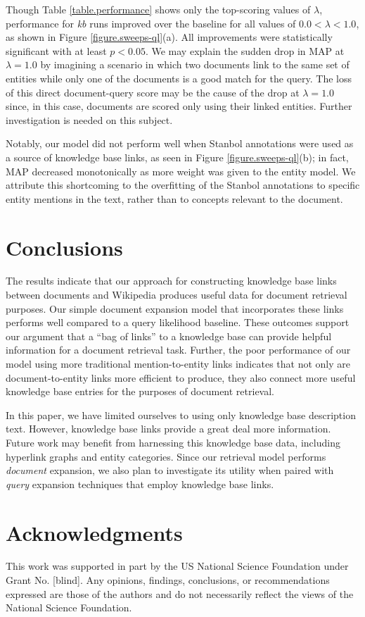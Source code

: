 \documentclass{sig-alternate}
\begin{document}
Though Table \ref{table.performance} shows only the top-scoring values of $\lambda$, performance for \textit{kb} runs improved over the baseline for all values of $0.0 < \lambda < 1.0$, as shown in Figure \ref{figure.sweeps-ql}(a). All improvements were statistically significant with at least $p < 0.05$. We may explain the sudden drop in MAP at $\lambda=1.0$ by imagining a scenario in which two documents link to the same set of entities while only one of the documents is a good match for the query. The loss of this direct document-query score may be the cause of the drop at $\lambda=1.0$ since, in this case, documents are scored only using their linked entities. Further investigation is needed on this subject.

Notably, our model did not perform well when Stanbol annotations were used as a source of knowledge base links, as seen in Figure \ref{figure.sweeps-ql}(b); in fact, MAP decreased monotonically as more weight was given to the entity model. We attribute this shortcoming to the overfitting of the Stanbol annotations to specific entity mentions in the text, rather than to concepts relevant to the document.

\section{Conclusions}\label{section.conclusions}

The results indicate that our approach for constructing knowledge base links between documents and Wikipedia produces useful data for document retrieval purposes. Our simple document expansion model that incorporates these links performs well compared to a query likelihood baseline. These outcomes support our argument that a ``bag of links'' to a knowledge base can provide helpful information for a document retrieval task. Further, the poor performance of our model using more traditional mention-to-entity links indicates that not only are document-to-entity links more efficient to produce, they also connect more useful knowledge base entries for the purposes of document retrieval.

In this paper, we have limited ourselves to using only knowledge base description text. However, knowledge base links provide a great deal more information. Future work may benefit from harnessing this knowledge base data, including hyperlink graphs and entity categories. Since our retrieval model performs \textit{document} expansion, we also plan to investigate its utility when paired with \textit{query} expansion techniques that employ knowledge base links.

\section{Acknowledgments}\label{section.acknowledgments}
This work was supported in part by the US National Science Foundation under Grant No. [blind]. Any opinions, findings, conclusions, or recommendations expressed are those of the authors and do not necessarily reflect the views of the National Science Foundation.



  
\end{document}
